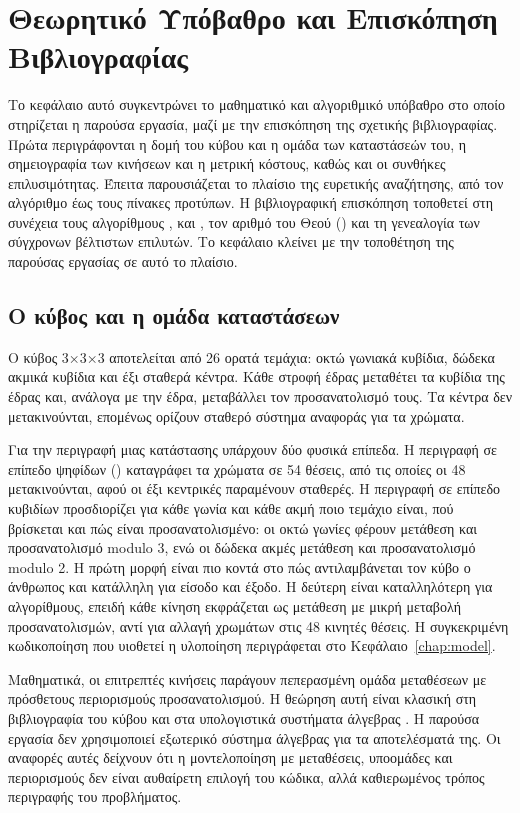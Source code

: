\chapter{Θεωρητικό Υπόβαθρο και Επισκόπηση Βιβλιογραφίας}
\label{chap:background}

Το κεφάλαιο αυτό συγκεντρώνει το μαθηματικό και αλγοριθμικό υπόβαθρο στο οποίο στηρίζεται η παρούσα εργασία, μαζί με την επισκόπηση της σχετικής βιβλιογραφίας. Πρώτα περιγράφονται η δομή του κύβου και η ομάδα των καταστάσεών του, η σημειογραφία των κινήσεων και η μετρική κόστους, καθώς και οι συνθήκες επιλυσιμότητας. Έπειτα παρουσιάζεται το πλαίσιο της ευρετικής αναζήτησης, από τον αλγόριθμο  έως τους πίνακες προτύπων. Η βιβλιογραφική επισκόπηση τοποθετεί στη συνέχεια τους αλγορίθμους ,  και , τον αριθμό του Θεού () και τη γενεαλογία των σύγχρονων βέλτιστων επιλυτών. Το κεφάλαιο κλείνει με την τοποθέτηση της παρούσας εργασίας σε αυτό το πλαίσιο.

\section{Ο κύβος και η ομάδα καταστάσεων}
\label{sec:background-group}

Ο κύβος 3×3×3 αποτελείται από 26 ορατά τεμάχια: οκτώ γωνιακά κυβίδια, δώδεκα ακμικά κυβίδια και έξι σταθερά κέντρα. Κάθε στροφή έδρας μεταθέτει τα κυβίδια της έδρας και, ανάλογα με την έδρα, μεταβάλλει τον προσανατολισμό τους. Τα κέντρα δεν μετακινούνται, επομένως ορίζουν σταθερό σύστημα αναφοράς για τα χρώματα.

Για την περιγραφή μιας κατάστασης υπάρχουν δύο φυσικά επίπεδα. Η περιγραφή σε επίπεδο ψηφίδων () καταγράφει τα χρώματα σε 54 θέσεις, από τις οποίες οι 48 μετακινούνται, αφού οι έξι κεντρικές παραμένουν σταθερές. Η περιγραφή σε επίπεδο κυβιδίων προσδιορίζει για κάθε γωνία και κάθε ακμή ποιο τεμάχιο είναι, πού βρίσκεται και πώς είναι προσανατολισμένο: οι οκτώ γωνίες φέρουν μετάθεση και προσανατολισμό modulo 3, ενώ οι δώδεκα ακμές μετάθεση και προσανατολισμό modulo 2. Η πρώτη μορφή είναι πιο κοντά στο πώς αντιλαμβάνεται τον κύβο ο άνθρωπος και κατάλληλη για είσοδο και έξοδο. Η δεύτερη είναι καταλληλότερη για αλγορίθμους, επειδή κάθε κίνηση εκφράζεται ως μετάθεση με μικρή μεταβολή προσανατολισμών, αντί για αλλαγή χρωμάτων στις 48 κινητές θέσεις. Η συγκεκριμένη κωδικοποίηση που υιοθετεί η υλοποίηση περιγράφεται στο Κεφάλαιο~\ref{chap:model}.

Μαθηματικά, οι επιτρεπτές κινήσεις παράγουν πεπερασμένη ομάδα μεταθέσεων με πρόσθετους περιορισμούς προσανατολισμού. Η θεώρηση αυτή είναι κλασική στη βιβλιογραφία του κύβου και στα υπολογιστικά συστήματα άλγεβρας \cite{joyner2008adventures,sageCubeGroup,gapRubikExample}. Η παρούσα εργασία δεν χρησιμοποιεί εξωτερικό σύστημα άλγεβρας για τα αποτελέσματά της. Οι αναφορές αυτές δείχνουν ότι η μοντελοποίηση με μεταθέσεις, υποομάδες και περιορισμούς δεν είναι αυθαίρετη επιλογή του κώδικα, αλλά καθιερωμένος τρόπος περιγραφής του προβλήματος.

